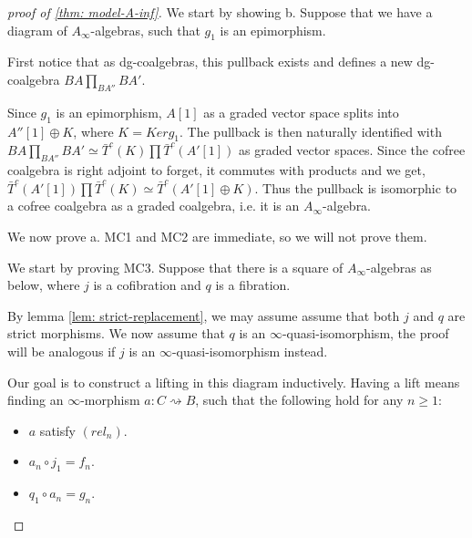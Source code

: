 \documentclass[../thesis.tex]{subfiles}
\begin{document}
        \begin{proof}[proof of \ref{thm: model-A-inf}]
            We start by showing b. Suppose that we have a diagram of $A_\infty$-algebras, such that $g_1$ is an epimorphism.
            \begin{center}
            \end{center}
            First notice that as dg-coalgebras, this pullback exists and defines a new dg-coalgebra $BA \prod_{BA''}BA'$.

            Since $g_1$ is an epimorphism, $A[1]$ as a graded vector space splits into $A''[1] \oplus K$, where $K = Kerg_1$. The pullback is then naturally identified with $BA \prod_{BA''}BA' \simeq \bar{T}^c(K)\prod \bar{T}^c(A'[1])$ as graded vector spaces. Since the cofree coalgebra is right adjoint to forget, it commutes with products and we get, $\bar{T}^c(A'[1])\prod \bar{T}^c(K) \simeq \bar{T}^c(A'[1]\oplus K)$. Thus the pullback is isomorphic to a cofree coalgebra as a graded coalgebra, i.e. it is an $A_\infty$-algebra.

            We now prove a. MC1 and MC2 are immediate, so we will not prove them.

            We start by proving MC3. Suppose that there is a square of $A_\infty$-algebras as below, where $j$ is a cofibration and $q$ is a fibration.
            \begin{center}
            \end{center}

            By lemma \ref{lem: strict-replacement}, we may assume assume that both $j$ and $q$ are strict morphisms. We now assume that $q$ is an $\infty$-quasi-isomorphism, the proof will be analogous if $j$ is an $\infty$-quasi-isomorphism instead.

            Our goal is to construct a lifting in this diagram inductively. Having a lift means finding an $\infty$-morphism $a : C \rightsquigarrow B$, such that the following hold for any $n\geq 1$:
            \begin{itemize}
                \item $a$ satisfy $(rel_n)$.
                \item $a_n \circ j_1 = f_n$.
                \item $q_1\circ a_n = g_n$.
            \end{itemize}


\end{proof}
\end{document}
